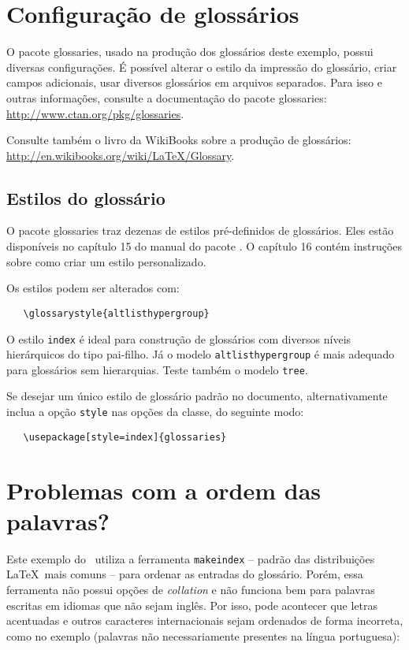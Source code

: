 \documentclass[
	12pt,				%
	openright,			%
	twoside,			%
	a4paper,			%
	english,			%
	french,				%
	spanish,			%
	brazil,				%
	]{abntex2}
\begin{document}
\section{Configuração de glossários}

O pacote \textsf{glossaries}, usado na produção dos glossários deste exemplo,
possui diversas configurações. É possível alterar o estilo da impressão do
glossário, criar campos adicionais, usar diversos glossários em
arquivos separados. Para isso e outras informações, consulte a documentação do
pacote \textsf{glossaries}: \url{http://www.ctan.org/pkg/glossaries}.

Consulte também o livro da WikiBooks sobre a produção de glossários:
\url{http://en.wikibooks.org/wiki/LaTeX/Glossary}.
 

\subsection{Estilos do glossário}

O pacote \textsf{glossaries} traz dezenas de estilos pré-definidos de
glossários. Eles estão disponíveis no capítulo 15 do manual do pacote
\cite{talbot2012}. O capítulo 16 contém instruções sobre como criar um estilo
personalizado.

Os estilos podem ser alterados com:

\begin{verbatim}
   \glossarystyle{altlisthypergroup}
\end{verbatim}

O estilo \texttt{index} é ideal para construção de glossários com diversos
níveis hierárquicos do tipo pai-filho. Já o modelo \texttt{altlisthypergroup} é
mais adequado para glossários sem hierarquias. Teste também o modelo
\texttt{tree}.

Se desejar um único estilo de glossário padrão no documento, alternativamente
inclua a opção \texttt{style} nas opções da classe, do
seguinte modo:

\begin{verbatim}
   \usepackage[style=index]{glossaries}
\end{verbatim}

\section{Problemas com a ordem das palavras?}

Este exemplo do \abnTeX\ utiliza a ferramenta \texttt{makeindex} -- padrão das
distribuições \LaTeX\ mais comuns -- para ordenar as entradas do glossário.
Porém, essa ferramenta não possui opções de \textit{collation} e não funciona
bem para palavras escritas em idiomas que não sejam inglês.
Por isso, pode acontecer que letras acentuadas e outros caracteres
internacionais sejam ordenados de forma incorreta, como no exemplo (palavras não
necessariamente presentes na língua portuguesa):
\end{document}

